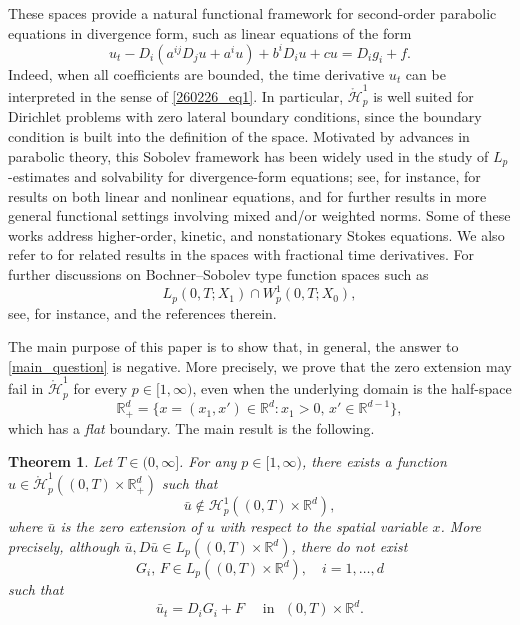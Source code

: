 \documentclass[reqno]{amsart}
\numberwithin{equation}{section}
\theoremstyle{plain}
\newtheorem{theorem}{Theorem}[section]
\theoremstyle{definition}
\def\bR{\mathbb{R}}
\def\cH{\mathcal{H}}
\begin{document}
These spaces provide a natural functional framework for second-order parabolic equations in divergence form, such as linear equations of the form
\[
u_t-D_i(a^{ij}D_j u+a^iu)+b^iD_iu+cu=D_i g_i+f.
\]
Indeed, when all coefficients are bounded, the time derivative $u_t$ can be interpreted in the sense of \eqref{260226_eq1}.
In particular, $\mathring{\cH}^1_p$ is well suited for Dirichlet problems with zero lateral boundary conditions, since the boundary condition is built into the definition of the space.
Motivated by advances in parabolic theory, this Sobolev framework has been widely used in the study of $L_p$-estimates and solvability for divergence-form equations; see, for instance, \cite{MR2541414, MR2187159, MR2329320, MR2832162, MR2835999, MR2304157} for results on both linear and nonlinear equations, and \cite{MR3947859, MR2650802, MR3812104, arXiv:2308.09220, MR4704640, MR2352490} for further results in more general functional settings involving mixed and/or weighted norms.
Some of these works address higher-order, kinetic, and nonstationary Stokes equations.
We also refer to \cite{MR4345837, MR4920684} for related results in the spaces with fractional time derivatives.
For further discussions on Bochner--Sobolev type function spaces such as
\[
L_p(0,T; X_1)\cap W^1_p(0,T; X_0),
\]
see, for instance, \cite{MR1345385, MR4249416, MR1230384, MR2597943, MR0350177, MR3012216, MR3524106, MR1846644} and the references therein.

\bigskip

The main purpose of this paper is to show that, in general, the answer to \eqref{main_question} is negative.
More precisely, we prove that the zero extension may fail in $\mathring{\cH}^1_p$ for every $p\in [1, \infty)$, even when the underlying domain is the half-space
$$
\bR^d_+=\{x=(x_1, x')\in \bR^d: x_1>0, \, x'\in \bR^{d-1}\},
$$
which has a \emph{flat} boundary.
The main result is the following.

\begin{theorem}		\label{MT}
Let $T\in (0, \infty]$.
For any $p\in [1, \infty)$,  there exists a function $u\in \mathring{\cH}^1_{p}((0,T)\times \bR^d_+)$ such that 
$$
\bar{u}\not\in \cH^1_{p}((0,T)\times \bR^d),
$$
where $\bar{u}$ is the zero extension of $u$ with respect to the spatial variable $x$.
More precisely, although $\bar u, D\bar u\in L_p((0,T)\times\bR^d)$, there do not exist
\[
G_i, \,F\in L_p((0,T)\times\bR^d), \quad i=1,\ldots,d
\]
such that
\[
\bar u_t=D_iG_i+F
\quad \text{ in }\,\, (0,T)\times\bR^d.
\]
\end{theorem}
\end{document}
